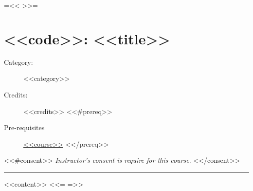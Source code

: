 {{=<< >>=}}
\chapter{\sc <<code>>: <<title>>} \label{syllabus:<<code>>}
\begin{description}
\item[Category:]<<category>>
\item[Credits:] <<credits>>
  <<#prereq>>
\item[Pre-requisites]
  \hyperlink{syllabus:<<course>>}{<<course>>}
  <</prereq>>
\end{description}
  <<#consent>>
  \emph{Instructor's consent is require for this course}.
  <</consent>>
\hrule
<<content>>
<<={{ }}=>>
